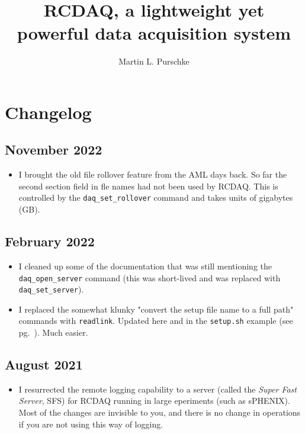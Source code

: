 \documentclass{article}[11pt]
\begin{document}
\title{RCDAQ, a lightweight yet powerful data acquisition system}
\author{Martin L. Purschke}
\maketitle

\tableofcontents

\newpage

\section{Changelog}

\subsection{November 2022}
\begin{itemize}
\item I brought the old file rollover feature from the AML days
  back. So far the second section field in fle names had not been used
  by RCDAQ. This is controlled by the \verb|daq_set_rollover| command
  and takes units of gigabytes (GB).

\end{itemize}

\subsection{February 2022}
\begin{itemize}
\item I cleaned up some of the documentation that was still mentioning
the \verb|daq_open_server| command (this was short-lived and was replaced
with \verb|daq_set_server|).
\item I replaced the somewhat klunky "convert the setup file name to a
full path" commands with \verb|readlink|. Updated here and in the
\verb|setup.sh| example (see pg.~\pageref{setupexample}). Much easier. 

\end{itemize}

\subsection{August 2021}
\begin{itemize}
\item I resurrected the remote logging capability to a server (called
  the \emph{Super Fast Server}, SFS) for RCDAQ running in large
  eperiments (such as sPHENIX). Most of the changes are invisible to
  you, and there is no change in operations if you are not using this
  way of logging.

\end{itemize}
\end{document}
